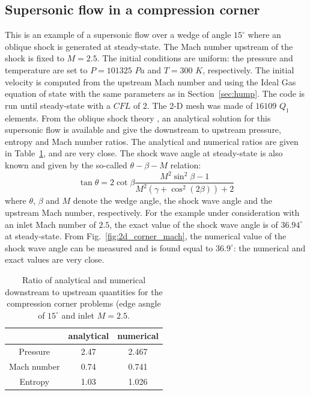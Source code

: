 \documentclass[preprint,10pt]{elsarticle}
\newcommand{\fig}[1]{Fig.~\ref{#1}}                      %
\newcommand{\tbl}[1]{Table~\ref{#1}}                     %
\newcommand{\sct}[1]{Section~\ref{#1}}                   %
\begin{document}
\subsection{Supersonic flow in a compression corner} \label{sec:corner}

This is an example of a supersonic flow over a wedge of angle $15^{\circ}$ where an oblique shock is generated at steady-state. The Mach number upstream of the shock is fixed to $M=2.5$. The initial conditions are uniform: the pressure and temperature are set to $P=101325$ $Pa$ and $T=300$ $K$, respectively. The initial velocity is computed from the upstream Mach number and using the Ideal Gas equation of state with the same parameters as in \sct{sec:hump}. The code is run until steady-state with a $CFL$ of $2$. The 2-D mesh was made of $16109$ $Q_1$ elements. From the oblique shock theory \cite{CompressionCorner}, an analytical solution for this supersonic flow is available and give the downstream to upstream pressure, entropy and Mach number ratios. The analytical and numerical ratios are given in \tbl{tbl:corner_exact_sol}, and are very close. The shock wave angle at steady-state is also known and given by the so-called $\theta -\beta -M$ relation:
%
\begin{equation}
\tan \theta = 2 \cot \beta \frac{M^2 \sin^2 \beta -1}{M^2 \left(\gamma+\cos^2 (2\beta)\right)+2} \nonumber
\end{equation}
%
where $\theta$, $\beta$ and $M$ denote the wedge angle, the shock wave angle and the upstream Mach number, respectively. For the example under consideration with an inlet Mach number of $2.5$, the exact value of the shock wave angle is of $36.94^{\circ}$ at steady-state. From \fig{fig:2d_corner_mach}, the numerical value of the shock wave angle can be measured and is found equal to $36.9^{\circ}$: the numerical and exact values are very close.
%
\begin{table}[H]
\begin{center}
 \caption{\label{tbl:corner_exact_sol} Ratio of analytical and numerical downstream to upstream quantities for the compression corner problems (edge asngle of $15^{\circ}$ and inlet $M=2.5$.}
 \begin{tabular}{|c|c|c|}  \hline
            & analytical & numerical\\ \hline
Pressure    & 2.47       & 2.467    \\ \hline
Mach number &  0.74      & 0.741    \\ \hline
Entropy     & 1.03       & 1.026    \\ \hline 
\end{tabular}
\end{center}
\end{table}
\end{document}
